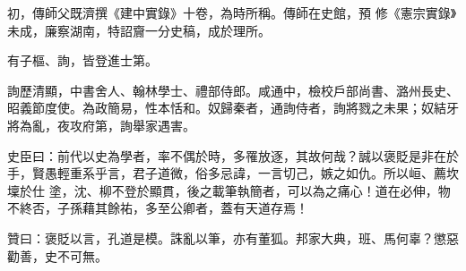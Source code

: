 \begin{pinyinscope}
 初，傳師父既濟撰《建中實錄》十卷，為時所稱。傳師在史館，預
 修《憲宗實錄》未成，廉察湖南，特詔齎一分史稿，成於理所。



 有子樞、詢，皆登進士第。



 詢歷清顯，中書舍人、翰林學士、禮部侍郎。咸通中，檢校戶部尚書、潞州長史、昭義節度使。為政簡易，性本恬和。奴歸秦者，通詢侍者，詢將戮之未果；奴結牙將為亂，夜攻府第，詢舉家遇害。



 史臣曰：前代以史為學者，率不偶於時，多罹放逐，其故何哉？誠以褒貶是非在於手，賢愚輕重系乎言，君子道微，俗多忌諱，一言切己，嫉之如仇。所以峘、薦坎壈於仕
 塗，沈、柳不登於顯貫，後之載筆執簡者，可以為之痛心！道在必伸，物不終否，子孫藉其餘祐，多至公卿者，蓋有天道存焉！



 贊曰：褒貶以言，孔道是模。誅亂以筆，亦有董狐。邦家大典，班、馬何辜？懲惡勸善，史不可無。



\end{pinyinscope}